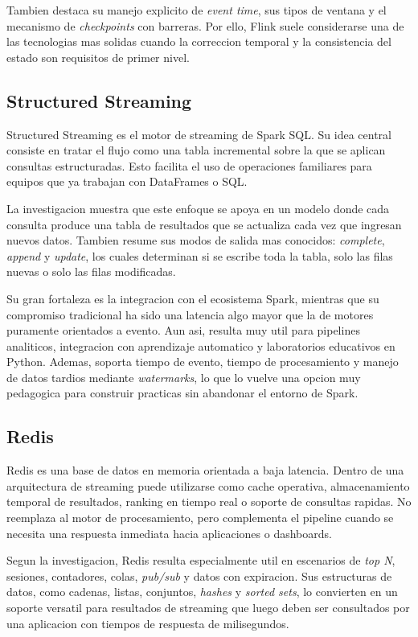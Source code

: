 \documentclass[12pt,a4paper]{article}
\begin{document}
Tambien destaca su manejo explicito de \textit{event time}, sus tipos de ventana y el mecanismo de \textit{checkpoints} con barreras. Por ello, Flink suele considerarse una de las tecnologias mas solidas cuando la correccion temporal y la consistencia del estado son requisitos de primer nivel.

\subsection{Structured Streaming}

Structured Streaming es el motor de streaming de Spark SQL. Su idea central consiste en tratar el flujo como una tabla incremental sobre la que se aplican consultas estructuradas. Esto facilita el uso de operaciones familiares para equipos que ya trabajan con DataFrames o SQL.

La investigacion muestra que este enfoque se apoya en un modelo donde cada consulta produce una tabla de resultados que se actualiza cada vez que ingresan nuevos datos. Tambien resume sus modos de salida mas conocidos: \textit{complete}, \textit{append} y \textit{update}, los cuales determinan si se escribe toda la tabla, solo las filas nuevas o solo las filas modificadas.

Su gran fortaleza es la integracion con el ecosistema Spark, mientras que su compromiso tradicional ha sido una latencia algo mayor que la de motores puramente orientados a evento. Aun asi, resulta muy util para pipelines analiticos, integracion con aprendizaje automatico y laboratorios educativos en Python. Ademas, soporta tiempo de evento, tiempo de procesamiento y manejo de datos tardios mediante \textit{watermarks}, lo que lo vuelve una opcion muy pedagogica para construir practicas sin abandonar el entorno de Spark.

\subsection{Redis}

Redis es una base de datos en memoria orientada a baja latencia. Dentro de una arquitectura de streaming puede utilizarse como cache operativa, almacenamiento temporal de resultados, ranking en tiempo real o soporte de consultas rapidas. No reemplaza al motor de procesamiento, pero complementa el pipeline cuando se necesita una respuesta inmediata hacia aplicaciones o dashboards.

Segun la investigacion, Redis resulta especialmente util en escenarios de \textit{top N}, sesiones, contadores, colas, \textit{pub/sub} y datos con expiracion. Sus estructuras de datos, como cadenas, listas, conjuntos, \textit{hashes} y \textit{sorted sets}, lo convierten en un soporte versatil para resultados de streaming que luego deben ser consultados por una aplicacion con tiempos de respuesta de milisegundos.
\end{document}
